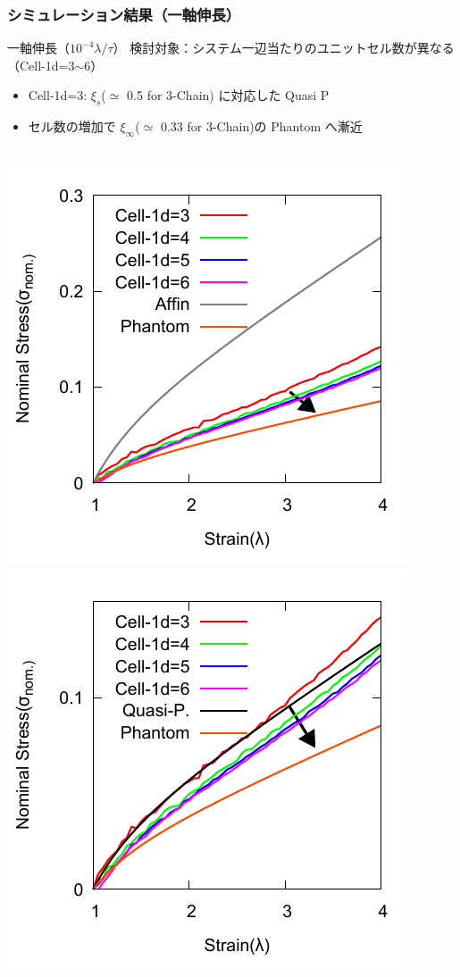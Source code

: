 \documentclass[11pt, dvipdfmx]{beamer}
\begin{document}
\begin{frame}
\frametitle{シミュレーション結果（一軸伸長）}
\small
\begin{exampleblock}{一軸伸長（$10^{-4}\lambda/\tau$）}
検討対象：システム一辺当たりのユニットセル数が異なる（Cell-1d=3$\sim$6）
\vspace{-5mm}
	\begin{itemize}
	\item
	Cell-1d=3: $\xi_s$($\simeq$ 0.5 for 3-Chain) に対応した Quasi P
	\item
	セル数の増加で $\xi_{\infty}$($\simeq$ 0.33 for 3-Chain)の Phantom へ漸近
	\end{itemize}
\end{exampleblock}
\vspace{-2mm}
\begin{columns}[totalwidth=\linewidth]
\includegraphics[width=0.9\columnwidth]{./fig/SS_affin_phantom.pdf}
\includegraphics[width=0.9\columnwidth]{./fig/SS_all.pdf}
\end{columns}
\end{frame}
\end{document}
